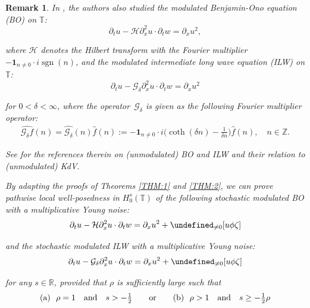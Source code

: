 \documentclass[letterpaper, 11pt,  reqno]{amsart}
\newtheorem{remark}[theorem]{Remark}
\DeclareMathOperator{\sgn}{sgn}
\newcommand{\1}{\hspace{0.5mm}\textup{I}\hspace{0.5mm}}
\newcommand{\noi}{\noindent}
\newcommand{\Z}{\mathbb{Z}}
\newcommand{\R}{\mathbb{R}}
\newcommand{\T}{\mathbb{T}}
\let\P= \undefined
\newcommand{\P}{\mathbf{P}}
\renewcommand{\H}{\mathcal{H}}
\newcommand{\dl}{\delta}
\newcommand{\ft}{\widehat}
\newcommand{\dx}{\partial_x}
\newcommand{\dt}{\partial_t}
\newcommand{\Gdl}{\mathcal{G}_{\dl} }
\newcommand{\ind}{\mathbf 1}
\numberwithin{equation}{section}
\numberwithin{theorem}{section}
\begin{document}
\begin{remark}\rm

In \cite{CGLLO1}, 
the authors also studied 
 the 
modulated Benjamin-Ono equation (BO) on $\T$:
\begin{equation}
\label{BO}
\dt u-    \H\dx^2 u \cdot \dt w=\dx u^2,
\end{equation}


\noi
where $\H$ denotes the
Hilbert transform
with the Fourier multiplier $- \ind_{n\ne 0}\cdot i \sgn (n)$, 
and 
the 
modulated 
intermediate long wave equation (ILW) on $\T$:
\begin{equation}
\label{ILW1}
\dt u-    \Gdl\dx^2 u \cdot \dt w =\dx u^2
\end{equation}

\noi
for  $0 < \dl < \infty$,
where the operator~$\Gdl$ is given 
as the following Fourier multiplier operator:
\begin{align}
\ft{\Gdl f}(n) =
\ft{\Gdl}(n) \ft f(n)
:=
- \ind_{n\ne 0}\cdot i \bigg(\coth(\dl n)  - \frac{1}{\dl n}\bigg) \ft{f}(n), \quad n\in\Z.
\label{GG1}
\end{align}


\noi
See \cite{CLO, CGLLO1, CHLO} for the references therein
on (unmodulated) BO and ILW and their relation to (unmodulated)
KdV.


By adapting the proofs of Theorems \ref{THM:1} and \ref{THM:2}, 
we can prove pathwise local well-posedness
in $H^s_0(\T)$ 
of the following stochastic modulated BO
with a multiplicative Young noise:
\begin{equation}
\label{sbo1}
\dt u-    \H\dx^2 u \cdot \dt w=\dx u^2 +  \P_{\ne 0}[u \phi \zeta]
\end{equation}

\noi
and
the stochastic modulated ILW
with a multiplicative Young noise:
\begin{equation}
\label{SILW1}
\dt u-    \Gdl\dx^2 u \cdot \dt w =\dx u^2
+  \P_{\ne 0}[u \phi \zeta]
\end{equation}

\noi
for any $s \in \R$, provided that $\rho$ is sufficiently large
such that 
\begin{align}
\begin{split}
\textup{(a)} \ \   \rho =  1 \quad \text{and} \quad s > - \tfrac 12
\qquad \text{or}\qquad 
\textup{(b)} \ \  \rho >  1 \quad  \text{and} \quad  s \ge - \tfrac 12 \rho
\end{split}
\label{regBO1}
\end{align}



\end{remark}
\end{document}
